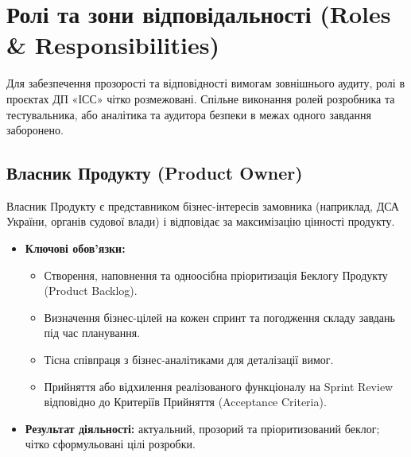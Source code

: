 \documentclass{article}
\begin{document}
\section{Ролі та зони відповідальності (Roles \& Responsibilities)}

Для забезпечення прозорості та відповідності вимогам зовнішнього аудиту, ролі в проєктах ДП «ІСС» чітко розмежовані. Спільне виконання ролей розробника та тестувальника, або аналітика та аудитора безпеки в межах одного завдання заборонено.

\subsection{Власник Продукту (Product Owner)}
Власник Продукту є представником бізнес-інтересів замовника (наприклад, ДСА України, органів судової влади) і відповідає за максимізацію цінності продукту.
\begin{itemize}
    \item \textbf{Ключові обов'язки:}
    \begin{itemize}
        \item Створення, наповнення та одноосібна пріоритизація Беклогу Продукту (Product Backlog).
        \item Визначення бізнес-цілей на кожен спринт та погодження складу завдань під час планування.
        \item Тісна співпраця з бізнес-аналітиками для деталізації вимог.
        \item Прийняття або відхилення реалізованого функціоналу на Sprint Review відповідно до Критеріїв Прийняття (Acceptance Criteria).
    \end{itemize}
    \item \textbf{Результат діяльності:} актуальний, прозорий та пріоритизований беклог; чітко сформульовані цілі розробки.
\end{itemize}
\end{document}
